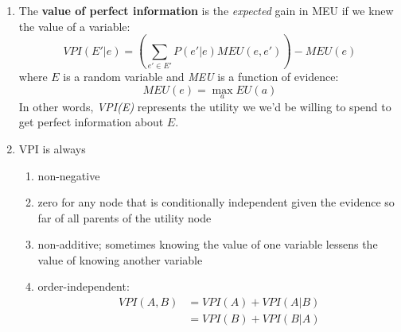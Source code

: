 \documentclass[10pt]{article}
\begin{document}
\begin{multicols}{2}
\begin{enumerate}
\begin{enumerate}
        \item The \textbf{value of perfect information} is the \textit{expected} gain in MEU if we knew the value of a variable:
        $$\textit{VPI}(E'|e)=\left( \sum_{e' \in E'} P(e'|e)\textit{MEU}(e,e') \right) - \textit{MEU}(e)$$
        where $E$ is a random variable and \textit{MEU} is a function of evidence:
        $$\textit{MEU}(e)=\max_{a}\textit{EU}(a)$$
        In other words, \textit{VPI(E)} represents the utility we we'd be willing to spend to get perfect information about $E$.
        \item VPI is always 
        \begin{enumerate}
            \item non-negative
            \item zero for any node that is conditionally independent given the evidence so far of all parents of the utility node
            \item non-additive; sometimes knowing the value of one variable lessens the value of knowing another variable
            \item order-independent: 
            \begin{align*}
     \textit{VPI}(A,B)&=\textit{VPI}(A)+\textit{VPI}(A|B) \\ &= \textit{VPI}(B)+\textit{VPI}(B|A)
            \end{align*}
        \end{enumerate}
    \end{enumerate}

\end{enumerate}
\end{multicols}
\end{document}

